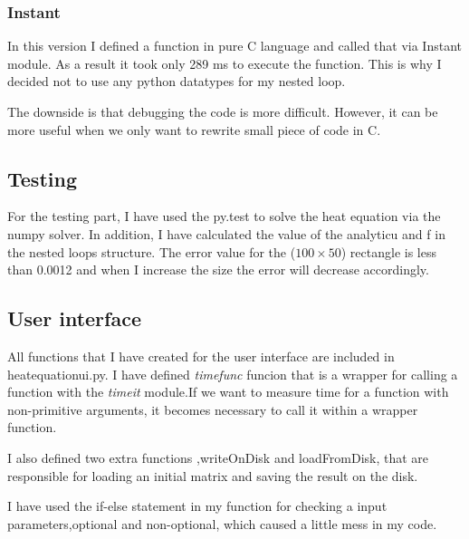 \documentclass{article}
\begin{document}
\subsubsection{Instant}
In this version I defined a function in pure C language and called that via Instant module. As a result it took only 289 ms to execute the function. This is why I decided not to use any python datatypes for my nested loop.
\par
The downside is that debugging the code is more difficult. However, it can be more useful when we only want to rewrite small piece of code in C.
\subsection{Testing}
For the testing part, I have used the py.test to solve the heat equation via the numpy solver. In addition, I have calculated the value of the analytic\textunderscore u and f in the nested loops structure. The error value for the ($100\times 50$) rectangle is less than 0.0012 and when I increase the size the error will decrease accordingly.
\subsection{User interface}

All functions that I have created for the user interface are included in heat\textunderscore equation\textunderscore ui.py. I have defined \textit{timefunc} funcion that is a wrapper for calling a function with the \textit{timeit} module.If we want to  measure time for a function with non-primitive arguments, it becomes necessary to call it within a wrapper function.

\par
I also defined two extra functions ,writeOnDisk and loadFromDisk, that are responsible for loading an initial matrix and saving the result on the disk.

\par
I have used the if-else statement in my function for checking a input parameters,optional and non-optional, which caused a little mess in my code. 
\end{document}
